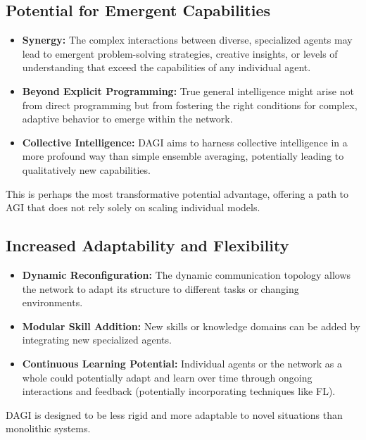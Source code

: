 \documentclass[12pt]{amsart}
\begin{document}
\subsection{Potential for Emergent Capabilities}
\begin{itemize}[leftmargin=*]
    \item \textbf{Synergy:} The complex interactions between diverse, specialized agents may lead to emergent problem-solving strategies, creative insights, or levels of understanding that exceed the capabilities of any individual agent.
    \item \textbf{Beyond Explicit Programming:} True general intelligence might arise not from direct programming but from fostering the right conditions for complex, adaptive behavior to emerge within the network.
    \item \textbf{Collective Intelligence:} DAGI aims to harness collective intelligence in a more profound way than simple ensemble averaging, potentially leading to qualitatively new capabilities.
\end{itemize}
This is perhaps the most transformative potential advantage, offering a path to AGI that does not rely solely on scaling individual models.

\subsection{Increased Adaptability and Flexibility}
\begin{itemize}[leftmargin=*]
    \item \textbf{Dynamic Reconfiguration:} The dynamic communication topology allows the network to adapt its structure to different tasks or changing environments.
    \item \textbf{Modular Skill Addition:} New skills or knowledge domains can be added by integrating new specialized agents.
    \item \textbf{Continuous Learning Potential:} Individual agents or the network as a whole could potentially adapt and learn over time through ongoing interactions and feedback (potentially incorporating techniques like FL).
\end{itemize}
DAGI is designed to be less rigid and more adaptable to novel situations than monolithic systems.
\end{document}
